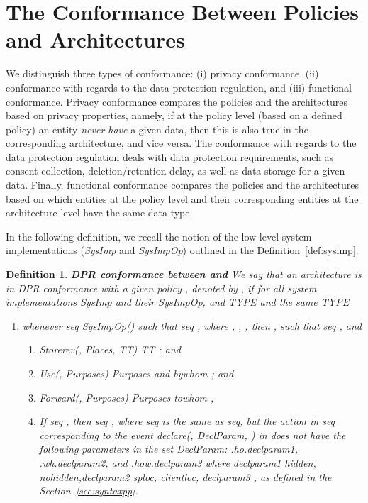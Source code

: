 \documentclass[a4paper]{article}
\newtheorem{ttd}{Definition}
\begin{document}
\section{The Conformance Between Policies and Architectures}
\label{conformance} 
We distinguish three types of conformance: (i) privacy conformance, (ii) conformance with regards to the data protection regulation, and (iii) functional conformance. Privacy conformance compares the policies and the architectures based on privacy properties, namely, if at the policy level (based on a defined policy) an entity \textit{never have} a given data, then this is also true in the corresponding architecture, and vice versa. The conformance with regards to the data protection regulation deals with data protection requirements, such as consent collection, deletion/retention delay, as well as data storage for a given data. Finally, functional conformance compares the policies and the architectures based on which entities at the policy level and their corresponding entities at the architecture level have the same data type. 

In the following definition, we recall the notion of the low-level system implementations (\textit{SysImp} and \textit{SysImpOp}) outlined in the Definition~\ref{def:sysimp}.

\begin{ttd}\textbf{DPR conformance between  and }
\label{paplconform}
\noindent We say that an architecture  is in DPR conformance with a given policy , denoted by   , if for all system implementations \textit{SysImp} and their \textit{SysImpOp},  and   \textit{TYPE} and the same    \textit{TYPE}
\begin{enumerate}
\item  whenever \textit{seq}  \textit{SysImpOp}() such that \textit{seq}  ,  where 
    , , , then 
   , such that \textit{seq}  , and 

\begin{enumerate}
\item \textit{Storerev}(, \textit{Places}, \textit{TT})     \textit{TT}  ; and  
\item \textit{Use}(, \textit{Purposes})    \textit{Purposes}  
and \textit{bywhom} ; and

\item \textit{Forward}(, \textit{Purposes})    \textit{Purposes}   
  \textit{towhom}  ,
\item If \textit{seq}  , then \textit{seq}  , where \textit{seq} is the same as \textit{seq}, but the action  in \textit{seq} corresponding to the event \textit{declare}(, \textit{DeclParam}, ) in  does not have the following parameters in the set \textit{DeclParam}: .\textit{ho}.\textit{declparam1}, .\textit{wh}.\textit{declparam2}, and .\textit{how}.\textit{declparam3} where \textit{declparam1}  \textit{hidden}, \textit{nohidden},\textit{declparam2}  \textit{sploc}, \textit{clientloc}, \textit{declparam3}  ,  as defined in the Section~\ref{sec:syntaxpp}.      
\end{enumerate} 
\end{enumerate}   
\end{ttd}
\end{document}
